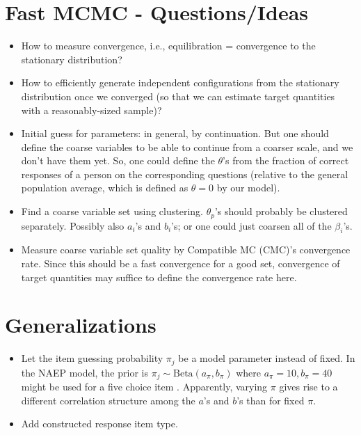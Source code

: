 \documentclass{article}
\newcommand{\ta}{\theta}
\begin{document}
\section{Fast MCMC - Questions/Ideas}
\begin{itemize}
	\item How to measure convergence, i.e., equilibration = convergence to the stationary distribution? 
	\item How to efficiently generate independent configurations from the stationary distribution once we converged
	(so that we can estimate target quantities with a reasonably-sized sample)?
	\item Initial guess for parameters: in general, by continuation. But one should define the coarse variables
	to be able to continue from a coarser scale, and we don't have them yet. So, one could define the $\ta$'s
	from the fraction of correct responses of a person on the corresponding questions (relative to the general
	population average, which is defined as $\ta=0$ by our model).
	\item Find a coarse variable set using clustering. $\ta_p$'s should probably be clustered separately. 	Possibly also $a_i$'s and $b_i$'s; or one could just coarsen all of the $\beta_i$'s.
	\item Measure coarse variable set quality by Compatible MC (CMC)'s convergence rate. Since this should be a fast convergence for a good set, convergence of target quantities may suffice to define the convergence rate here.
\end{itemize}

\section{Generalizations}
\begin{itemize}
	\item Let the item guessing probability $\pi_j$ be a model parameter instead of fixed. In the NAEP model,
	the prior is $\pi_j \sim {\mbox{Beta}}(a_{\pi}, b_{\pi})$ where $a_{\pi}=10, b_{\pi}=40$ might be used for a five
	choice item \cite{matt02}. Apparently, varying $\pi$ gives rise to a different correlation structure among the $a$'s and $b$'s than for fixed $\pi$.
	\item Add constructed response item type.
\end{itemize}



\end{document}
